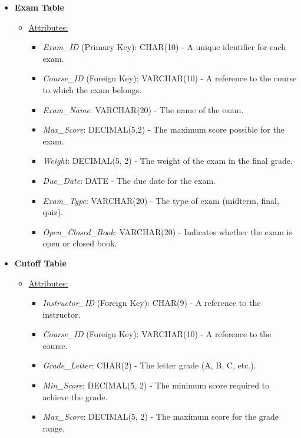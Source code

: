 \documentclass[12pt]{article}
\begin{document}
\begin{itemize}
    \item \textbf{Exam Table}
    \begin{itemize}
        \item \underline{Attributes:}
        \begin{itemize}
            \item \textit{Exam\_ID} (Primary Key): CHAR(10) - A unique identifier for each exam.
            \item \textit{Course\_ID} (Foreign Key): VARCHAR(10) - A reference to the course to which the exam belongs.
            \item \textit{Exam\_Name}: VARCHAR(20) - The name of the exam.
            \item \textit{Max\_Score}: DECIMAL(5,2) - The maximum score possible for the exam.
            \item \textit{Weight}: DECIMAL(5, 2) - The weight of the exam in the final grade.
            \item \textit{Due\_Date}: DATE - The due date for the exam.
            \item \textit{Exam\_Type}: VARCHAR(20) - The type of exam (midterm, final, quiz).
            \item \textit{Open\_Closed\_Book}: VARCHAR(20) - Indicates whether the exam is open or closed book.
        \end{itemize}
    \end{itemize}
    
    \item \textbf{Cutoff Table}
    \begin{itemize}
        \item \underline{Attributes:}
        \begin{itemize}
            \item \textit{Instructor\_ID} (Foreign Key): CHAR(9) - A reference to the instructor.
            \item \textit{Course\_ID} (Foreign Key): VARCHAR(10) - A reference to the course.
            \item \textit{Grade\_Letter}: CHAR(2) - The letter grade (A, B, C, etc.).
            \item \textit{Min\_Score}: DECIMAL(5, 2) - The minimum score required to achieve the grade.
            \item \textit{Max\_Score}: DECIMAL(5, 2) - The maximum score for the grade range.
        \end{itemize}
    \end{itemize}


\end{itemize}
\end{document}
